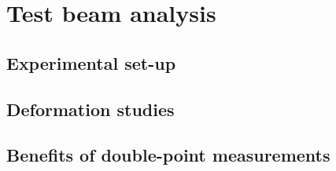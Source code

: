 \chapter{Test beam analysis}

  \section{Experimental set-up}

  \section{Deformation studies}

  \section{Benefits of double-point measurements}
